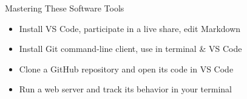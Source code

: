 \documentclass[14pt,aspectratio=169]{beamer}
\begin{document}
%
\begin{frame}{Mastering These Software Tools}
  \begin{itemize}
    \item Install VS Code, participate in a live share, edit Markdown
    \item Install Git command-line client, use in terminal \& VS Code
    \item Clone a GitHub repository and open its code in VS Code
    \item Run a web server and track its behavior in your terminal
  \end{itemize}
\end{frame}
\end{document}
